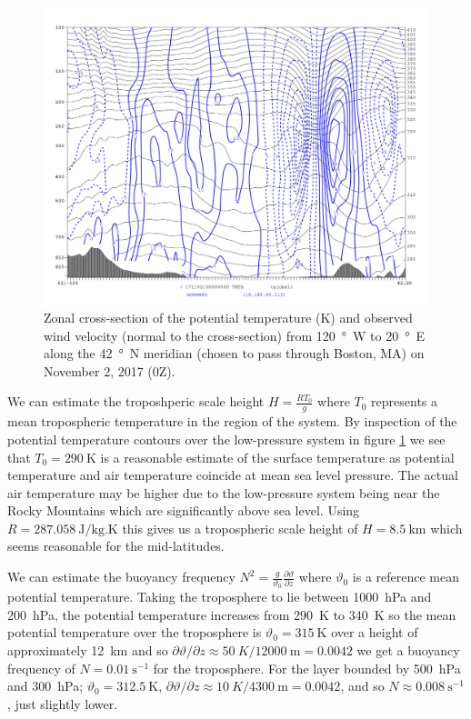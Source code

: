 \documentclass[11pt]{article}
\newcommand\p[2]{\frac{\partial #1}{\partial #2}}
\begin{document}
\begin{figure}[h!]
  \centering
  \includegraphics[width=\textwidth]{thta_normwnd_42N_120W-20E}
  \caption{Zonal cross-section of the potential temperature (K) and observed wind velocity (normal to the cross-section) from \SI{120}{\degree W} to \SI{20}{\degree E} along the \SI{42}{\degree N} meridian (chosen to pass through Boston, MA) on November 2, 2017 (0Z).}
  \label{fig:thta_normwnd_zon_xsec}
\end{figure}

We can estimate the troposhperic scale height $\displaystyle H = \frac{R T_0}{g}$ where $T_0$ represents a mean tropospheric temperature in the region of the system. By inspection of the potential temperature contours over the low-pressure system in figure \ref{fig:thta_normwnd_zon_xsec} we see that $T_0 = \SI{290}{\K}$ is a reasonable estimate of the surface temperature as potential temperature and air temperature coincide at mean sea level pressure. The actual air temperature may be higher due to the low-pressure system being near the Rocky Mountains which are significantly above sea level. Using $R = \SI{287.058}{\J/\kg.\K}$ this gives us a tropospheric scale height of $H = \SI{8.5}{\km}$ which seems reasonable for the mid-latitudes.

We can estimate the buoyancy frequency $\displaystyle N^2 = \frac{g}{\vartheta_0} \p{\vartheta}{z}$ where $\vartheta_0$ is a reference mean potential temperature. Taking the troposphere to lie between \SI{1000}{\hecto\Pa} and \SI{200}{\hecto\Pa}, the potential temperature increases from \SI{290}{\K} to \SI{340}{\K} so the mean potential temperature over the troposphere is $\vartheta_0 = \SI{315}{\K}$ over a height of approximately \SI{12}{\kilo\m} and so $\partial \vartheta/\partial z \approx \SI{50}{K}/\SI{12000}{\m} = 0.0042$ we get a buoyancy frequency of $N = \SI{0.01}{\s^{-1}}$ for the troposphere. For the layer bounded by \SI{500}{\hecto\Pa} and \SI{300}{\hecto\Pa}; $\vartheta_0 = \SI{312.5}{\K}$, $\partial \vartheta/\partial z \approx \SI{10}{K}/\SI{4300}{\m} = 0.0042$, and so $N \approx \SI{0.008}{\s^{-1}}$, just slightly lower.
\end{document}
